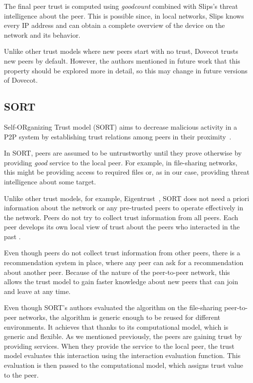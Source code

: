 The final peer trust is computed using \textit{goodcount} combined with Slips's threat intelligence about the peer. 
This is possible since, in local networks, Slips knows every IP address and can obtain a complete overview of the device on the network and its behavior.

Unlike other trust models where new peers start with no trust, Dovecot trusts new peers by default. 
However, the authors mentioned in future work that this property should be explored more in detail, so this may change in future versions of Dovecot.

\subsection{SORT}
\label{subsec:sort}
Self-ORganizing Trust model (SORT) aims to decrease malicious activity in a P2P system by establishing trust relations among peers in their proximity~\cite{sort}.

In SORT, peers are assumed to be untrustworthy until they prove otherwise by providing \textit{good} service to the local peer. 
For example, in file-sharing networks, this might be providing access to required files or, as in our case, providing threat intelligence about some target.

Unlike other trust models, for example, Eigentrust~\cite{kamvar2003eigentrust}, SORT does not need a priori information about the network or any pre-trusted peers to operate effectively in the network.
Peers do not try to collect trust information from all peers.
Each peer develops its own local view of trust about the peers who interacted in the past \cite{sort}.

Even though peers do not collect trust information from other peers, there is a recommendation system in place, where any peer can ask for a recommendation about another peer.
Because of the nature of the peer-to-peer network, this allows the trust model to gain faster knowledge about new peers that can join and leave at any time.

Even though SORT's authors evaluated the algorithm on the file-sharing peer-to-peer networks, the algorithm is generic enough to be reused for different environments.
It achieves that thanks to its computational model, which is generic and flexible.
As we mentioned previously, the peers are gaining trust by providing services. 
When they provide the service to the local peer, the trust model evaluates this interaction using the interaction evaluation function.
This evaluation is then passed to the computational model, which assigns trust value to the peer.


